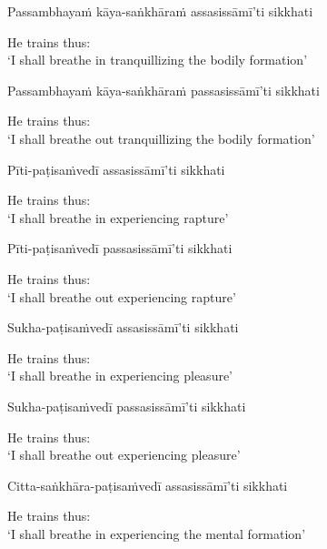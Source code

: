 Passambhayaṁ kāya-saṅkhāraṁ assasissāmī'ti sikkhati

\begin{english}
  He trains thus:\\
  `I shall breathe in tranquillizing the bodily formation'\makeatletter\hyperlink{endnote68-appendix}\makeatother
\end{english}

Passambhayaṁ kāya-saṅkhāraṁ passasissāmī'ti sikkhati

\begin{english}
  He trains thus:\\
  `I shall breathe out tranquillizing the bodily formation'
\end{english}

Pīti-paṭisaṁvedī assasissāmī'ti sikkhati

\begin{english}
  He trains thus:\\
  `I shall breathe in experiencing rapture'
\end{english}

Pīti-paṭisaṁvedī passasissāmī'ti sikkhati

\begin{english}
  He trains thus:\\
  `I shall breathe out experiencing rapture'
\end{english}

Sukha-paṭisaṁvedī assasissāmī'ti sikkhati

\begin{english}
  He trains thus:\\
  `I shall breathe in experiencing pleasure'
\end{english}

Sukha-paṭisaṁvedī passasissāmī'ti sikkhati

\begin{english}
  He trains thus:\\
  `I shall breathe out experiencing pleasure'
\end{english}

Citta-saṅkhāra-paṭisaṁvedī assasissāmī'ti sikkhati

\begin{english}
  He trains thus:\\
  `I shall breathe in experiencing the mental formation'\makeatletter\hyperlink{endnote69-appendix}\makeatother
\end{english}

